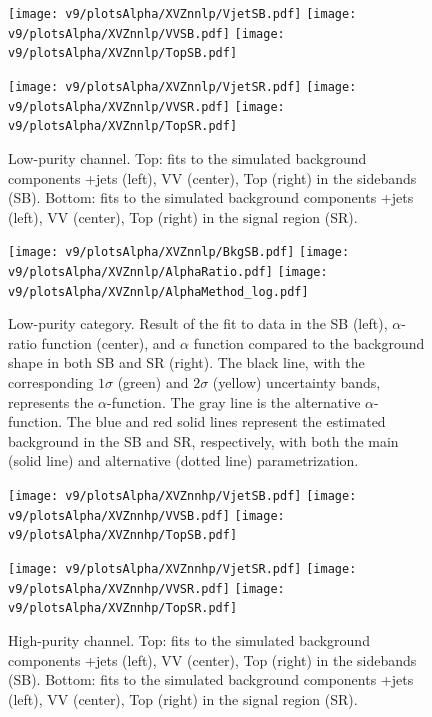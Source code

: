 \begin{figure}[!htb]
  \centering
    \texttt{[image: v9/plotsAlpha/XVZnnlp/VjetSB.pdf]}
    \texttt{[image: v9/plotsAlpha/XVZnnlp/VVSB.pdf]}
    \texttt{[image: v9/plotsAlpha/XVZnnlp/TopSB.pdf]}

    \texttt{[image: v9/plotsAlpha/XVZnnlp/VjetSR.pdf]}
    \texttt{[image: v9/plotsAlpha/XVZnnlp/VVSR.pdf]}
    \texttt{[image: v9/plotsAlpha/XVZnnlp/TopSR.pdf]}
    \caption{Low-purity channel. Top: fits to the simulated background components \V+jets (left), VV (center), Top (right) in the sidebands (SB). Bottom: fits to the simulated background components \V+jets (left), VV (center), Top (right) in the signal region (SR).}
  \label{fig:XVZnnlp}
\end{figure}

\begin{figure}[!htb]
  \centering
    \texttt{[image: v9/plotsAlpha/XVZnnlp/BkgSB.pdf]}
    \texttt{[image: v9/plotsAlpha/XVZnnlp/AlphaRatio.pdf]}
    \texttt{[image: v9/plotsAlpha/XVZnnlp/AlphaMethod\_log.pdf]}
  \caption{Low-purity category. Result of the fit to data in the SB (left), $\alpha$-ratio function (center), and $\alpha$ function compared to the background shape in both SB and SR (right). The black line, with the corresponding $1\sigma$ (green) and $2\sigma$ (yellow) uncertainty bands, represents the $\alpha$-function. The gray line is the alternative $\alpha$-function. The blue and red solid lines represent the estimated background in the SB and SR, respectively, with both the main (solid line) and alternative (dotted line) parametrization.}
  \label{fig:XVZnnlp_Alpha}
\end{figure}


\begin{figure}[!htb]
  \centering
    \texttt{[image: v9/plotsAlpha/XVZnnhp/VjetSB.pdf]}
    \texttt{[image: v9/plotsAlpha/XVZnnhp/VVSB.pdf]}
    \texttt{[image: v9/plotsAlpha/XVZnnhp/TopSB.pdf]}

    \texttt{[image: v9/plotsAlpha/XVZnnhp/VjetSR.pdf]}
    \texttt{[image: v9/plotsAlpha/XVZnnhp/VVSR.pdf]}
    \texttt{[image: v9/plotsAlpha/XVZnnhp/TopSR.pdf]}
    \caption{High-purity channel. Top: fits to the simulated background components \V+jets (left), VV (center), Top (right) in the sidebands (SB). Bottom: fits to the simulated background components \V+jets (left), VV (center), Top (right) in the signal region (SR).}
  \label{fig:XVZnnhp}
\end{figure}

